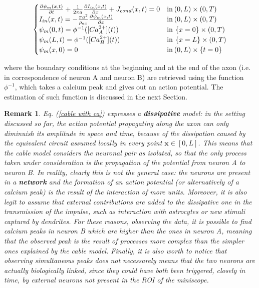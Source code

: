 \documentclass[12pt, a4paper]{report}
\newtheorem{remark}{Remark}
\begin{document}
\begin{equation}
	\begin{cases} 
	\frac{\partial \psi_m(x,t)}{\partial t} + \frac{1}{2 \pi a }\frac{\partial I_{in}(x,t)}{\partial x} + J_{cond}(x,t) = 0 & \text{in} \hspace{0.07 cm} (0,L) \times (0,T) \\ 
	I_{in}(x,t) = -\frac{\pi a^2}{\rho_{ax}}\frac{\partial \psi_m(x,t)}{\partial x} & \text{in} \hspace{0.07 cm} (0,L) \times (0,T) \\
	\psi_m(0,t) = \phi^{-1}([Ca_A^{2+}](t)) & \text{in} \hspace{0.07 cm} \left\{ x = 0\right\} \times (0,T) \\
	\psi_m(L,t) = \phi^{-1}([Ca_B^{2+}](t)) & \text{in} \hspace{0.07 cm} \left\{ x = L\right\} \times (0,T) \\
	\psi_m(x,0)=0  & \text{in} \hspace{0.07 cm}  (0,L) \times \left\{ t = 0\right\}
	\end{cases} \label{cable with ca}
\end{equation}	

where the boundary conditions at the beginning and at the end of the axon (i.e. in correspondence of neuron A and neuron B) are retrieved using the  function $\phi^{-1}$, which takes a  calcium peak  and gives out an action potential. The estimation of such function is discussed in the next Section.

\begin{remark}\label{remark cc}
	Eq. (\ref{cable with ca}) expresses a \textbf{dissipative} model: in the setting discussed so far, the action potential propagating along the axon can only diminuish its amplitude in space and time, because of the dissipation caused by the equivalent circuit assumed locally in every point $\textbf{x} \in [0,L]$. This means that the cable model considers the neuronal pair as isolated, so that the only process taken under consideration is the propagation of the potential from neuron A to neuron B. In reality, clearly this is not the general case: the neurons are present in a \textbf{network} and the formation of an action potential (or alternatively of a calcium peak) is the result of the interaction of more units. Moreover, it is also legit to assume that external contributions are added to the dissipative one in the transmission of the impulse, such as interaction with astrocytes or new stimuli captured by dendrites. For these reasons, observing the data, it is possible to find calcium peaks in neuron B which are higher than the ones in neuron A, meaning that the observed peak is the result of processes more complex than the simpler ones explained by the cable model. Finally, it is also worth to notice that observing simultaneous peaks does not necessarely means that the two neurons are actually biologically linked, since they could have both  been triggered, closely in time, by external neurons not present in the ROI  of the miniscope.
\end{remark}
\end{document}
